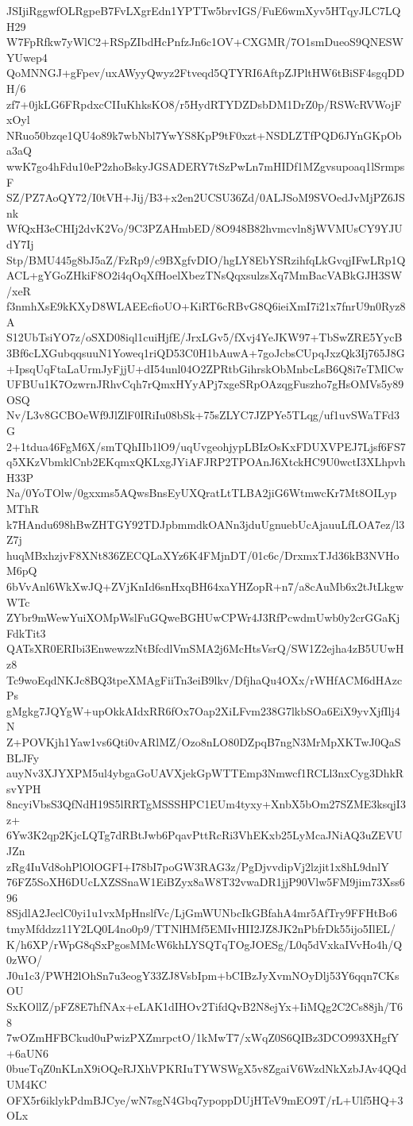 JSIjiRggwfOLRgpeB7FvLXgrEdn1YPTTw5brvIGS/FuE6wmXyv5HTqyJLC7LQH29
W7FpRfkw7yWlC2+RSpZIbdHcPnfzJn6c1OV+CXGMR/7O1smDueoS9QNESWYUwep4
QoMNNGJ+gFpev/uxAWyyQwyz2Ftveqd5QTYRI6AftpZJPltHW6tBiSF4sgqDDH/6
zf7+0jkLG6FRpdxcCIIuKhksKO8/r5HydRTYDZDsbDM1DrZ0p/RSWcRVWojFxOyl
NRuo50bzqe1QU4o89k7wbNbl7YwYS8KpP9tF0xzt+NSDLZTfPQD6JYnGKpOba3aQ
wwK7go4hFdu10eP2zhoBskyJGSADERY7tSzPwLn7mHIDf1MZgvsupoaq1lSrmpsF
SZ/PZ7AoQY72/I0tVH+Jij/B3+x2en2UCSU36Zd/0ALJSoM9SVOedJvMjPZ6JSnk
WfQxH3eCHIj2dvK2Vo/9C3PZAHmbED/8O948B82hvmcvln8jWVMUsCY9YJUdY7Ij
Stp/BMU445g8bJ5aZ/FzRp9/c9BXgfvDIO/hgLY8EbYSRzihfqLkGvqjIFwLRp1Q
ACL+gYGoZHkiF8O2i4qOqXfHoelXbezTNsQqxsulzsXq7MmBacVABkGJH3SW/xeR
f3nmhXsE9kKXyD8WLAEEcfioUO+KiRT6cRBvG8Q6ieiXmI7i21x7fnrU9n0Ryz8A
S12UbTsiYO7z/oSXD08iql1cuiHjfE/JrxLGv5/fXvj4YeJKW97+TbSwZRE5YycB
3Bf6cLXGubqqsuuN1Yoweq1riQD53C0H1bAuwA+7goJcbsCUpqJxzQk3Ij765J8G
+IpsqUqFtaLaUrmJyFjjU+dI54unl04O2ZPRtbGihrskObMnbcLsB6Q8i7eTMlCw
UFBUu1K7OzwrnJRhvCqh7rQmxHYyAPj7xgeSRpOAzqgFuszho7gHsOMVs5y89OSQ
Nv/L3v8GCBOeWf9JlZlF0IRiIu08bSk+75sZLYC7JZPYe5TLqg/uf1uvSWaTFd3G
2+1tdua46FgM6X/smTQhIIb1lO9/uqUvgeohjypLBIzOsKxFDUXVPEJ7Ljsf6FS7
q5XKzVbmklCnb2EKqmxQKLxgJYiAFJRP2TPOAnJ6XtckHC9U0wctI3XLhpvhH33P
Na/0YoTOlw/0gxxms5AQwsBnsEyUXQratLtTLBA2jiG6WtmwcKr7Mt8OILypMThR
k7HAndu698hBwZHTGY92TDJpbmmdkOANn3jduUgnuebUcAjauuLfLOA7ez/l3Z7j
huqMBxhzjvF8XNt836ZECQLaXYz6K4FMjnDT/01c6c/DrxmxTJd36kB3NVHoM6pQ
6bVvAnl6WkXwJQ+ZVjKnId6snHxqBH64xaYHZopR+n7/a8cAuMb6x2tJtLkgwWTc
ZYbr9mWewYuiXOMpWslFuGQweBGHUwCPWr4J3RfPcwdmUwb0y2crGGaKjFdkTit3
QATsXR0ERIbi3EnwewzzNtBfcdlVmSMA2j6McHtsVsrQ/SW1Z2ejha4zB5UUwHz8
Tc9woEqdNKJc8BQ3tpeXMAgFiiTn3eiB9lkv/DfjhaQu4OXx/rWHfACM6dHAzcPs
gMgkg7JQYgW+upOkkAIdxRR6fOx7Oap2XiLFvm238G7lkbSOa6EiX9yvXjfIlj4N
Z+POVKjh1Yaw1vs6Qti0vARlMZ/Ozo8nLO80DZpqB7ngN3MrMpXKTwJ0QaSBLJFy
auyNv3XJYXPM5ul4ybgaGoUAVXjekGpWTTEmp3Nmwcf1RCLl3nxCyg3DhkRsvYPH
8ncyiVbsS3QfNdH19S5lRRTgMSSSHPC1EUm4tyxy+XnbX5bOm27SZME3ksqjI3z+
6Yw3K2qp2KjcLQTg7dRBtJwb6PqavPttRcRi3VhEKxb25LyMcaJNiAQ3uZEVUJZn
zRg4IuVd8ohPlOlOGFI+I78bI7poGW3RAG3z/PgDjvvdipVj2lzjit1x8hL9dnlY
76FZ5SoXH6DUcLXZSSnaW1EiBZyx8aW8T32vwaDR1jjP90Vlw5FM9jim73Xss696
8SjdlA2JeclC0yi1u1vxMpHnslfVc/LjGmWUNbcIkGBfahA4mr5AfTry9FFHtBo6
tmyMfddzz11Y2LQ0L4no0p9/TTNlHMf5EMIvHII2JZ8JK2nPbfrDk55ijo5IlEL/
K/h6XP/rWpG8qSxPgosMMcW6khLYSQTqTOgJOESg/L0q5dVxkaIVvHo4h/Q0zWO/
J0u1c3/PWH2lOhSn7u3eogY33ZJ8VsbIpm+bCIBzJyXvmNOyDlj53Y6qqn7CKsOU
SxKOllZ/pFZ8E7hfNAx+eLAK1dIHOv2TifdQvB2N8ejYx+IiMQg2C2Cs88jh/T68
7wOZmHFBCkud0uPwizPXZmrpctO/1kMwT7/xWqZ0S6QIBz3DCO993XHgfY+6aUN6
0bueTqZ0nKLnX9iOQeRJXhVPKRIuTYWSWgX5v8ZgaiV6WzdNkXzbJAv4QQdUM4KC
OFX5r6iklykPdmBJCye/wN7sgN4Gbq7ypoppDUjHTeV9mEO9T/rL+Ulf5HQ+3OLx
